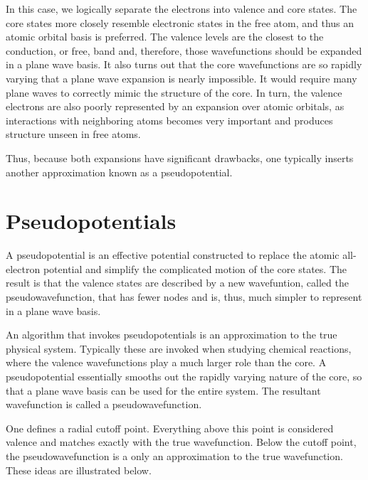 \documentclass[notitlepage,letter,preprint,prb]{revtex4}
\begin{document}
	In this case, we logically separate the electrons into valence and core states.  The core states more closely resemble electronic states in the free atom, and thus an atomic orbital basis is preferred.  The valence levels are the closest to the conduction, or free, band and, therefore, those wavefunctions should be expanded in a plane wave basis.  It also turns out that the core wavefunctions are so rapidly varying that a plane wave expansion is nearly impossible.  It would require many plane waves to correctly mimic the structure of the core.  In turn, the valence electrons are also poorly represented by an expansion over atomic orbitals, as interactions with neighboring atoms becomes very important and produces structure unseen in free atoms. 
	
	Thus, because both expansions have significant drawbacks, one typically inserts another approximation known as a pseudopotential.     
\section{Pseudopotentials}
	A pseudopotential is an effective potential constructed to replace the atomic all-electron potential and simplify the complicated motion of the core states.  The result is that the valence states are described by a new wavefuntion, called the pseudowavefunction, that has fewer nodes and is, thus, much simpler to represent in a plane wave basis.  
	
	An algorithm that invokes pseudopotentials is an approximation to the true physical system.  Typically these are invoked when studying chemical reactions, where the valence wavefunctions play a much larger role than the core.  A pseudopotential essentially smooths out the rapidly varying nature of the core, so that a plane wave basis can be used for the entire system.  The resultant wavefunction is called a pseudowavefunction.
	
	One defines a radial cutoff point.  Everything above this point is considered valence and matches exactly with the true wavefunction.  Below the cutoff point, the pseudowavefunction is a only an approximation to the true wavefunction\citealp{planewave}.  These ideas are illustrated below.  
	
\end{document}

